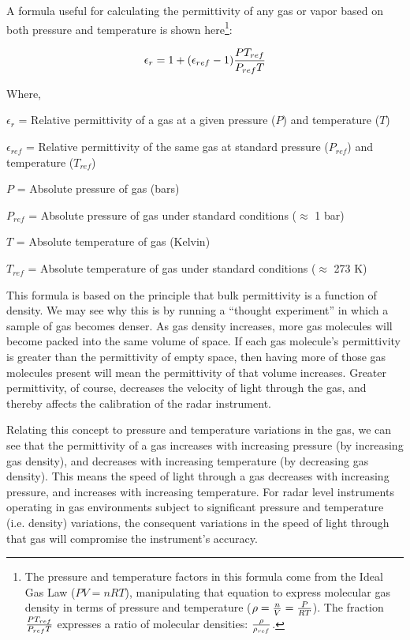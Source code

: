 A formula useful for calculating the permittivity of any gas or vapor based on both pressure and temperature is shown here\footnote{The pressure and temperature factors in this formula come from the Ideal Gas Law ($PV = nRT$), manipulating that equation to express molecular gas density in terms of pressure and temperature ($\rho = {n \over V} = {P \over RT}$).  The fraction ${P T_{ref} \over P_{ref} T}$ expresses a ratio of molecular densities: $\rho \over \rho_{ref}$.}:

$$\epsilon_r = 1 + (\epsilon_{ref} - 1) {P T_{ref} \over P_{ref} T}$$

\noindent
Where,

$\epsilon_r$ = Relative permittivity of a gas at a given pressure ($P$) and temperature ($T$)

$\epsilon_{ref}$ = Relative permittivity of the same gas at standard pressure ($P_{ref}$) and temperature ($T_{ref}$)

$P$ = Absolute pressure of gas (bars)

$P_{ref}$ = Absolute pressure of gas under standard conditions ($\approx$ 1 bar)

$T$ = Absolute temperature of gas (Kelvin)

$T_{ref}$ = Absolute temperature of gas under standard conditions ($\approx$ 273 K)

\vskip 10pt

This formula is based on the principle that bulk permittivity is a function of density.  We may see why this is by running a ``thought experiment'' in which a sample of gas becomes denser.  As gas density increases, more gas molecules will become packed into the same volume of space.  If each gas molecule's permittivity is greater than the permittivity of empty space, then having more of those gas molecules present will mean the permittivity of that volume increases.  Greater permittivity, of course, decreases the velocity of light through the gas, and thereby affects the calibration of the radar instrument.     

Relating this concept to pressure and temperature variations in the gas, we can see that the permittivity of a gas increases with increasing pressure (by increasing gas density), and decreases with increasing temperature (by decreasing gas density).  This means the speed of light through a gas decreases with increasing pressure, and increases with increasing temperature.  For radar level instruments operating in gas environments subject to significant pressure and temperature (i.e. density) variations, the consequent variations in the speed of light through that gas will compromise the instrument's accuracy.


